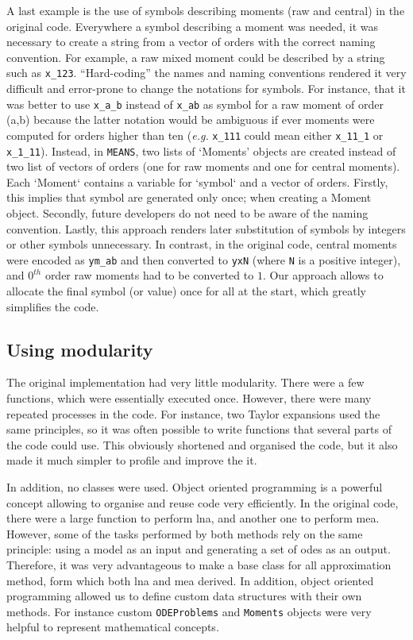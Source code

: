 \documentclass[11pt,a4paper]{article}
\newcommand{\means}{\texttt{MEANS}}
\newcommand{\eg}{\emph{e.g.}}
\begin{document}
A last example is the use of symbols describing moments (raw and central) in the original code.
Everywhere a symbol describing a moment was needed, it was necessary to create a string from a vector of orders with the correct naming convention.
For example, a raw mixed moment could be described by a string such as \verb"x_123".
``Hard-coding'' the names and naming conventions rendered it very difficult and error-prone to change the notations for symbols.
For instance, that it was better to use \verb"x_a_b" instead of \verb"x_ab" as symbol for a raw moment of order (a,b)
because the latter notation would be ambiguous if ever moments were computed for orders higher than ten (\eg{} \verb"x_111" could mean either \verb"x_11_1"  or \verb"x_1_11").
Instead, in \means, two lists of `Moments' objects are created instead of two list of vectors of orders (one for raw moments and one for central moments).
Each `Moment` contains a variable for `symbol` and a vector of orders.
Firstly, this implies that symbol are generated only once; when creating a Moment object.
Secondly, future developers do not need to be aware of the naming convention.
Lastly, this approach renders later substitution of symbols by integers or other symbols unnecessary.
In contrast, in the original code, central moments were encoded as \verb"ym_ab" and then
converted to \verb"yxN" (where \verb"N"  is a positive integer),
and $0^{th}$ order raw moments had to be converted to $1$.
Our approach allows to allocate the final symbol (or value) once for all at the start, which greatly simplifies the code.

\subsection{Using modularity}

The original implementation had very little modularity.
There were a few functions, which were essentially executed once.
However, there were many repeated processes in the code.
For instance, two Taylor expansions used the same principles, 
so it was often possible to write functions that several parts of the code could use.
This obviously shortened and organised the code, but it also made it much simpler to profile and improve the it.
 
In addition, no classes were used.
Object oriented programming is a powerful concept allowing to organise and reuse code very efficiently.
In the original code, there were a large function to perform \gls{lna}, and another one to perform \gls{mea}.
However, some of the tasks performed by both methods rely on the same principle: using a model as an input and generating a set of \glspl{ode} as an output.
Therefore, it was very advantageous to make a base class for all approximation method, form which both \gls{lna} and \gls{mea} derived.
In addition, object oriented programming allowed us to define custom data structures with their own methods.
For instance custom \texttt{ODEProblems} and \texttt{Moments} objects were very helpful to represent mathematical concepts.
\end{document}
